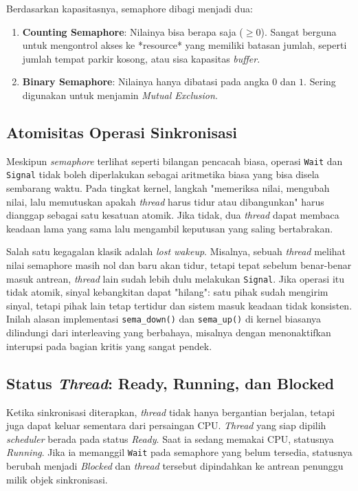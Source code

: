 Berdasarkan kapasitasnya, semaphore dibagi menjadi dua:
\begin{enumerate}
	\item \textbf{Counting Semaphore}: Nilainya bisa berapa saja ($\geq 0$). Sangat berguna untuk mengontrol akses ke *resource* yang memiliki batasan jumlah, seperti jumlah tempat parkir kosong, atau sisa kapasitas \textit{buffer}.
	\item \textbf{Binary Semaphore}: Nilainya hanya dibatasi pada angka $0$ dan $1$. Sering digunakan untuk menjamin \textit{Mutual Exclusion}.
\end{enumerate}

\subsection{Atomisitas Operasi Sinkronisasi}
Meskipun \textit{semaphore} terlihat seperti bilangan pencacah biasa, operasi \texttt{Wait} dan \texttt{Signal} tidak boleh diperlakukan sebagai aritmetika biasa yang bisa disela sembarang waktu. Pada tingkat kernel, langkah "memeriksa nilai, mengubah nilai, lalu memutuskan apakah \textit{thread} harus tidur atau dibangunkan" harus dianggap sebagai satu kesatuan atomik. Jika tidak, dua \textit{thread} dapat membaca keadaan lama yang sama lalu mengambil keputusan yang saling bertabrakan.

Salah satu kegagalan klasik adalah \textit{lost wakeup}. Misalnya, sebuah \textit{thread} melihat nilai semaphore masih nol dan baru akan tidur, tetapi tepat sebelum benar-benar masuk antrean, \textit{thread} lain sudah lebih dulu melakukan \texttt{Signal}. Jika operasi itu tidak atomik, sinyal kebangkitan dapat "hilang": satu pihak sudah mengirim sinyal, tetapi pihak lain tetap tertidur dan sistem masuk keadaan tidak konsisten. Inilah alasan implementasi \texttt{sema\_down()} dan \texttt{sema\_up()} di kernel biasanya dilindungi dari interleaving yang berbahaya, misalnya dengan menonaktifkan interupsi pada bagian kritis yang sangat pendek.

\subsection{Status \textit{Thread}: Ready, Running, dan Blocked}
Ketika sinkronisasi diterapkan, \textit{thread} tidak hanya bergantian berjalan, tetapi juga dapat keluar sementara dari persaingan CPU. \textit{Thread} yang siap dipilih \textit{scheduler} berada pada status \textit{Ready}. Saat ia sedang memakai CPU, statusnya \textit{Running}. Jika ia memanggil \texttt{Wait} pada semaphore yang belum tersedia, statusnya berubah menjadi \textit{Blocked} dan \textit{thread} tersebut dipindahkan ke antrean penunggu milik objek sinkronisasi.

